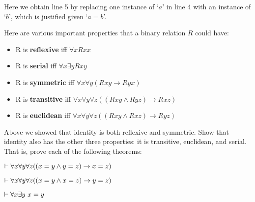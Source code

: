 
\noindent Here we obtain line 5 by replacing one instance of `$a$' in line 4 with an instance of `$b$', which is justified given `$a= b$'. 


\practiceproblems

\problempart Here are various important properties that a binary relation $R$ could have:

\begin{itemize}
\item[] R is \textbf{reflexive} iff $\forall x Rxx$
\item[] R is \textbf{serial} iff $\forall x \exists y Rxy$
\item[] R is \textbf{symmetric} iff $\forall x \forall y(Rxy \rightarrow Ryx)$
\item[] R is \textbf{transitive} iff $\forall x \forall y \forall z((Rxy \land Ryz) \rightarrow Rxz)$
\item[] R is \textbf{euclidean} iff $\forall x \forall y \forall z((Rxy \land Rxz) \rightarrow Ryz)$
\end{itemize} 

\noindent Above we showed that identity is both reflexive and symmetric.  Show that identity also has the other three properties: it is transitive, euclidean, and serial.  That is, prove each of the following theorems:

\begin{earg}
\item $\vdash \forall x \forall y \forall z((x=y \land y = z) \rightarrow x = z)$
\item $\vdash \forall x \forall y \forall z((x=y \land x=z) \rightarrow y = z)$
\item $\vdash \forall x \exists y \ x = y$
\end{earg}




